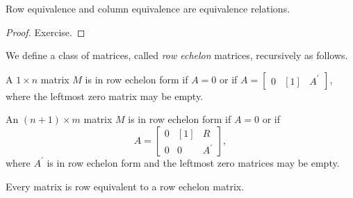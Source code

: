 \documentclass{memoir}
\begin{document}
\begin{prp}
Row equivalence and column equivalence are equivalence relations.
\end{prp}

\begin{proof}
Exercise.
\end{proof}

\begin{dfn}
We define a class of matrices, called \emph{row echelon} matrices, recursively as follows.
\begin{enumerate*}
\item A $1 \times n$ matrix $M$ is in row echelon form if $A = 0$ or if $A = \left[ \begin{array}{c|c|c} 0 & [1] & A^\prime \end{array} \right]$, where the leftmost zero matrix may be empty.
\item An $(n+1) \times m$ matrix $M$ is in row echelon form if $A = 0$ or if \[ A = \left[ \begin{array}{c|c|c} 0 & [1] & R \\ \hline 0 & 0 & A^\prime \end{array}\right],\] where $A^\prime$ is in row echelon form and the leftmost zero matrices may be empty.
\end{enumerate*}
\end{dfn}

\begin{prp}
Every matrix is row equivalent to a row echelon matrix.
\end{prp}
\end{document}
